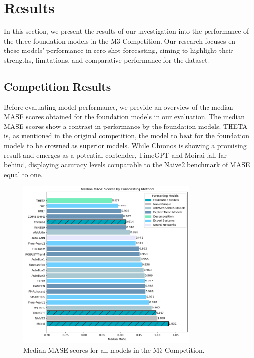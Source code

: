 \documentclass[12pt,a4paper]{article}
\begin{document}
\newpage
{\centering \section{Results} \par}

In this section, we present the results of our investigation into the performance of the three foundation models in the M3-Competition. Our research focuses on these models' performance in zero-shot forecasting, aiming to highlight their strengths, limitations, and comparative performance for the dataset. 

\subsection{Competition Results}

Before evaluating model performance, we provide an overview of the median MASE scores obtained for the foundation models in our evaluation. The median MASE scores show a contrast in performance by the foundation models. THETA is, as mentioned in the original competition, the model to beat for the foundation models to be crowned as superior models. While Chronos is showing a promising result and emerges as a potential contender, TimeGPT and Moirai fall far behind, displaying accuracy levels comparable to the Naive2 benchmark of MASE equal to one. 

\begin{figure}[htbp]
  \centering
  \includegraphics[width=0.8\textwidth]{median_mase_overall.png}
  \caption{Median MASE scores for all models in the M3-Competition.}
  \label{median_mase_scores}
\end{figure}
\end{document}
